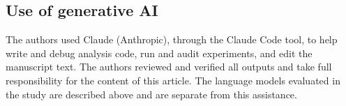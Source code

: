 \subsection{Use of generative AI}

The authors used Claude (Anthropic), through the Claude Code tool, to help write and debug analysis code, run and audit experiments, and edit the manuscript text. The authors reviewed and verified all outputs and take full responsibility for the content of this article. The language models evaluated in the study are described above and are separate from this assistance.
